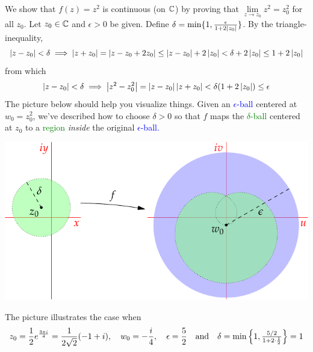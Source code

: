 \begin{example}{}{}
	We show that $f(z)=z^2$ is continuous (on $\mathbb{C}$) by proving that $\lim\limits_{z\to z_0}z^2=z_0^2$ for all $z_0$.\smallbreak
	Let $z_0\in\mathbb{C}$ and $\epsilon>0$ be given. Define $\delta=\min\{1,\frac\epsilon{1+2\left| z_0\right|}\}$. By the triangle-inequality,
	\[
		\left| z-z_0\right|<\delta\implies \left| z+z_0\right|=\left| z-z_0+2z_0\right|\le \left| z-z_0\right|+2\left| z_0\right|<\delta+2\left| z_0\right|\le 1+2\left| z_0\right|
	\]
	from which
	\[
		\left| z-z_0\right|<\delta\implies \left| z^2-z_0^2\right|=\left| z-z_0\right|\left| z+z_0\right|<\delta(1+2\left| z_0\right|)\le \epsilon
	\]
	The picture below should help you visualize things. Given an \textcolor{blue}{$\epsilon$-ball} centered at $w_0=z_0^2$, we've described how to choose $\delta>0$ so that $f$ maps the \textcolor{Green}{$\delta$-ball} centered at $z_0$ to a \textcolor{Green}{region} \emph{inside} the original \textcolor{blue}{$\epsilon$-ball.}
	\begin{center}
		\includegraphics{limits-zsq}
	\end{center}
	The picture illustrates the case when
	\[
		z_0=\frac 12e^{\frac{3\pi i}{4}}=\frac 1{2\sqrt 2}(-1+i),\quad w_0=-\frac i4,\quad \epsilon=\frac 52\quad\text{and}\quad \delta=\min\left\{1,\tfrac{5/2}{1+2\cdot\frac 12}\right\}=1
	\]
\end{example}
\goodbreak


